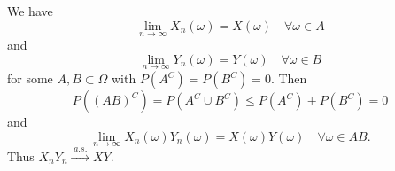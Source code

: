 \documentclass{article}[12pt]
\newcommand{\as}{\;a.s.\;}
\newcommand{\asto}{\overset{\as}{\to}}
\begin{document}
\subsection{}
We have
\[
  \lim_{n \to \infty} X_n(\omega) = X(\omega) \quad \forall \omega \in A
\]
and
\[
  \lim_{n \to \infty} Y_n(\omega) = Y(\omega) \quad \forall \omega \in B
\]
for some $A, B \subset \Omega$ with $P(A^C) = P(B^C) = 0$.
Then
\[
  P((AB)^C) = P(A^C \cup B^C) \leq P(A^C) + P(B^C) = 0
\]
and
\[
  \lim_{n \to \infty} X_n(\omega)Y_n(\omega) = X(\omega)Y(\omega) \quad \forall \omega \in AB.
\]
Thus $X_n Y_n \asto XY$.
\end{document}
